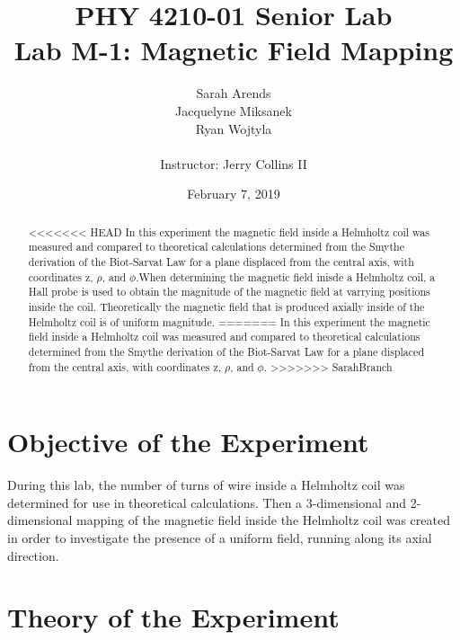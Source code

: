 \documentclass[a4paper]{article}
\title{PHY 4210-01 Senior Lab \\Lab M-1: Magnetic Field Mapping}
\author{Sarah Arends \\ 
        Jacquelyne Miksanek \\
        Ryan Wojtyla \\ \\
        Instructor: Jerry Collins II}
\date{February 7, 2019}
\begin{document}
\maketitle 

\begin{abstract}
<<<<<<< HEAD
In this experiment the magnetic field inside a Helmholtz coil was measured and compared to theoretical calculations determined from the Smythe derivation of the Biot-Sarvat Law for a plane displaced from the central axis, with coordinates z, $\rho$, and $\phi$.When determining the magnetic field inisde a Helmholtz coil, a Hall probe is used to obtain the magnitude of the magnetic field at varrying positions inside the coil. Theoretically the magnetic field that is produced axially inside of the Helmholtz coil is of uniform magnitude.    
=======
In this experiment the magnetic field inside a Helmholtz coil was measured and compared to theoretical calculations determined from the Smythe derivation of the Biot-Sarvat Law for a plane displaced from the central axis, with coordinates z, $\rho$, and $\phi$. 
>>>>>>> SarahBranch
\end{abstract}

\newpage

\tableofcontents

\newpage

\section{Objective of the Experiment}
During this lab, the number of turns of wire inside a Helmholtz coil was determined for use in theoretical calculations. Then a 3-dimensional and 2-dimensional mapping of the magnetic field inside the Helmholtz coil was created in order to investigate the presence of a uniform field, running along its axial direction.

\section{Theory of the Experiment}
\end{document}
